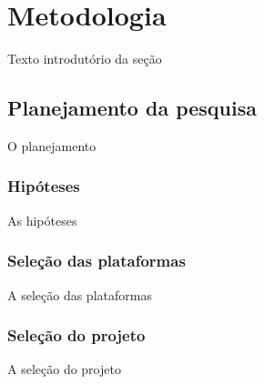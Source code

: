 \chapter{Metodologia} \label{metodologia}

Texto introdutório da seção

\section{Planejamento da pesquisa} \label{sec:planejamento}

O planejamento

\subsection{Hipóteses} \label{subsec:hipoteses}

As hipóteses

\subsection{Seleção das plataformas} \label{subsec:selecaodasplataformas}

A seleção das plataformas

\subsection{Seleção do projeto} \label{subsec:selecaodoprojeto}

A seleção do projeto